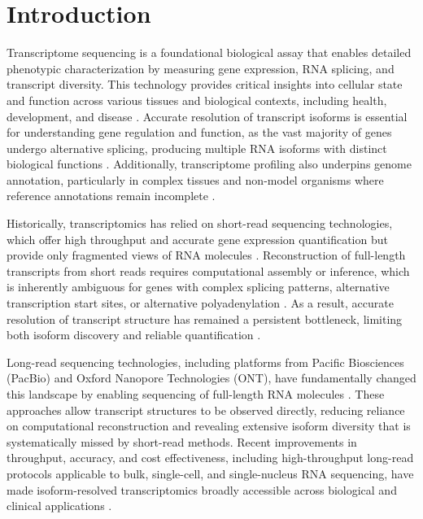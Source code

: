 \section{Introduction}\label{introduction}

Transcriptome sequencing is a foundational biological assay that enables detailed phenotypic characterization by measuring gene expression, RNA splicing, and transcript diversity. This technology provides critical insights into cellular state and function across various tissues and biological contexts, including health, development, and disease \citep{wang2009, stark2019}. Accurate resolution of transcript isoforms is essential for understanding gene regulation and function, as the vast majority of genes undergo alternative splicing, producing multiple RNA isoforms with distinct biological functions \citep{keren2010, nilsen2010}. Additionally, transcriptome profiling also underpins genome annotation, particularly in complex tissues and non-model organisms where reference annotations remain incomplete \citep{haas2002, haas2003, haas2008, pertea2018, grabherr2011}.

Historically, transcriptomics has relied on short-read sequencing technologies, which offer high throughput and accurate gene expression quantification but provide only fragmented views of RNA molecules \citep{mortazavi2008}. Reconstruction of full-length transcripts from short reads requires computational assembly or inference, which is inherently ambiguous for genes with complex splicing patterns, alternative transcription start sites, or alternative polyadenylation \citep{garber2011, martin2011}. As a result, accurate resolution of transcript structure has remained a persistent bottleneck, limiting both isoform discovery and reliable quantification \citep{steijger2013, teng2016}.

Long-read sequencing technologies, including platforms from Pacific Biosciences (PacBio) and Oxford Nanopore Technologies (ONT), have fundamentally changed this landscape by enabling sequencing of full-length RNA molecules \citep{tilgner2014, sharon2013}. These approaches allow transcript structures to be observed directly, reducing reliance on computational reconstruction and revealing extensive isoform diversity that is systematically missed by short-read methods. Recent improvements in throughput, accuracy, and cost effectiveness, including high-throughput long-read protocols applicable to bulk, single-cell, and single-nucleus RNA sequencing, have made isoform-resolved transcriptomics broadly accessible across biological and clinical applications \citep{amarasinghe2020, volden2018, alkhafaji2024}.

